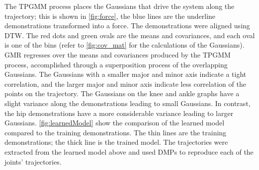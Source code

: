 The TPGMM process places the Gaussians that drive the system along the trajectory; this is shown in \autoref{fig:force}, the blue lines are the underline demonstrations transformed into a force.  The demonstrations were aligned using DTW. The red dots and green ovals are the means and covariances, and each oval is one of the bins (refer to \autoref{fig:cov_mat} for the calculations of the Gaussians).  GMR regresses over the means and covariances produced by the TPGMM process, accomplished through a superposition process of the overlapping Gaussians. The Gaussians with a smaller major and minor axis indicate a tight correlation, and the larger major and minor axis indicate less correlation of the points on the trajectory.  The Gaussians on the knee and ankle graphs have a slight variance along the demonstrations leading to small Gaussians. In contrast, the hip demonstrations have a more considerable variance leading to larger Gaussians. \autoref{fig:learnedModel} show the comparison of the learned model compared to the training demonstrations. The thin lines are the training demonstrations; the thick line is the trained model. The trajectories were extracted from the learned model above and used DMPs to reproduce each of the joints' trajectories. 



